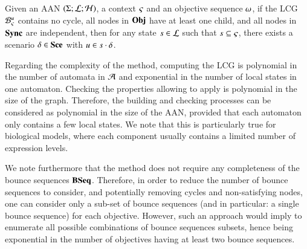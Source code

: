 \begin{theorem}
\label{th:approxinf}
  Given an AAN $(\Sigma; \mathcal{L}; \mathcal{H})$,
  a context $\varsigma$ and an objective sequence $\omega$,
  if the LCG ${\mathcal{B}_{\varsigma}^{u}}$ contains no cycle,
  all nodes in $\mathbf{Obj}$ have at least one child,
  and all nodes in $\mathbf{Sync}$ are independent,
  then for any state $s\in\mathcal{L}$ such that $s\subseteq\varsigma$,
  there exists a scenario $\delta\in\mathbf{Sce}$ with $u\in s\cdot\delta$.
\end{theorem}

Regarding the complexity of the method,
computing the LCG is polynomial in the number of automata in $\mathcal{A}$ and exponential in the number of local states in one automaton.
Checking the properties allowing to apply  is polynomial in the size of the graph.
Therefore, the building and checking processes can be considered as polynomial in the size
of the AAN, provided that each automaton only contains a few local states.
We note that this is particularly true for biological models, where
each component usually contains a limited number of expression levels.

We note furthermore that the method does not require any completeness of the bounce sequences
$\mathbf{BSeq}$.
Therefore, in order to reduce the number of bounce sequences to consider, and potentially removing
cycles and non-satisfying nodes,
one can consider only a sub-set of bounce sequences
(and in particular: a single bounce sequence) for each objective.
However, such an approach would imply to enumerate all possible combinations of bounce sequences
subsets, hence being exponential in the number of objectives having at least two bounce sequences.



